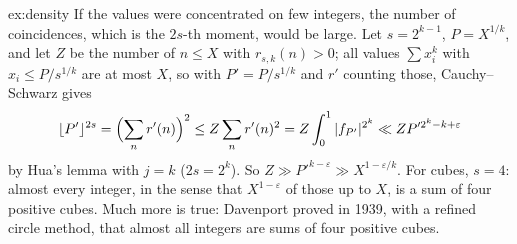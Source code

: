 \begin{solution}{ex:density}
\idea If the values were concentrated on few integers, the number of coincidences, which is the $2s$-th moment, would be large.
\writeup Let $s=2^{k-1}$, $P=X^{1/k}$, and let $Z$ be the number of $n\le X$ with $r_{s,k}(n)>0$; all values $\sum x_i^k$ with $x_i\le P/s^{1/k}$ are at most $X$, so with $P'=P/s^{1/k}$ and $r'$ counting those, Cauchy--Schwarz gives
\[
\lfloor P'\rfloor^{2s}=\Bigl(\sum_nr'(n)\Bigr)^2\le Z\sum_nr'(n)^2=Z\int_0^1|f_{P'}|^{2^k}\ll ZP'^{2^k-k+\varepsilon}
\]
by Hua's lemma with $j=k$ ($2s=2^k$). So $Z\gg P'^{k-\varepsilon}\gg X^{1-\varepsilon/k}$. For cubes, $s=4$: almost every integer, in the sense that $X^{1-\varepsilon}$ of those up to $X$, is a sum of four positive cubes. Much more is true: Davenport proved in 1939, with a refined circle method, that almost all integers are sums of four positive cubes.
\end{solution}

